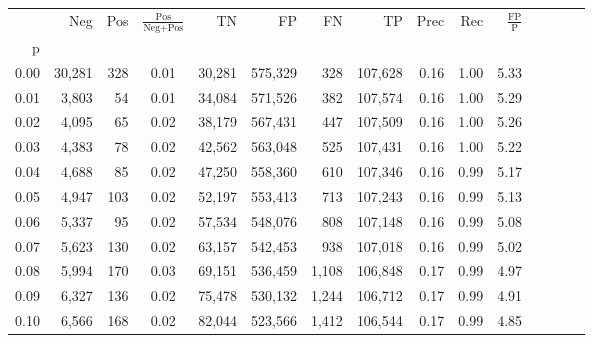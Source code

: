\begin{tabular}{rrrcrrrrrrrrrrr}
\toprule
{} &     Neg &    Pos & $\frac{\text{Pos}}{\text{Neg}+\text{Pos}}$ &       TN &       FP &       FN &       TP &  Prec &   Rec & $\frac{\text{FP}}{\text{P}}$ \\
p    &         &        &                                            &          &          &          &          &       &       &                              \\
\midrule
0.00 &  30,281 &    328 &                                       0.01 &   30,281 &  575,329 &      328 &  107,628 &  0.16 &  1.00 &                         5.33 \\
0.01 &   3,803 &     54 &                                       0.01 &   34,084 &  571,526 &      382 &  107,574 &  0.16 &  1.00 &                         5.29 \\
0.02 &   4,095 &     65 &                                       0.02 &   38,179 &  567,431 &      447 &  107,509 &  0.16 &  1.00 &                         5.26 \\
0.03 &   4,383 &     78 &                                       0.02 &   42,562 &  563,048 &      525 &  107,431 &  0.16 &  1.00 &                         5.22 \\
0.04 &   4,688 &     85 &                                       0.02 &   47,250 &  558,360 &      610 &  107,346 &  0.16 &  0.99 &                         5.17 \\
0.05 &   4,947 &    103 &                                       0.02 &   52,197 &  553,413 &      713 &  107,243 &  0.16 &  0.99 &                         5.13 \\
0.06 &   5,337 &     95 &                                       0.02 &   57,534 &  548,076 &      808 &  107,148 &  0.16 &  0.99 &                         5.08 \\
0.07 &   5,623 &    130 &                                       0.02 &   63,157 &  542,453 &      938 &  107,018 &  0.16 &  0.99 &                         5.02 \\
0.08 &   5,994 &    170 &                                       0.03 &   69,151 &  536,459 &    1,108 &  106,848 &  0.17 &  0.99 &                         4.97 \\
0.09 &   6,327 &    136 &                                       0.02 &   75,478 &  530,132 &    1,244 &  106,712 &  0.17 &  0.99 &                         4.91 \\
0.10 &   6,566 &    168 &                                       0.02 &   82,044 &  523,566 &    1,412 &  106,544 &  0.17 &  0.99 &                         4.85 \\

\end{tabular}
